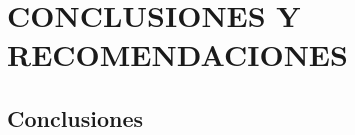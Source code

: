 \documentclass[12pt]{report}
\begin{document}





\pagebreak
\chapter{CONCLUSIONES Y RECOMENDACIONES}


\section{Conclusiones}





\pagebreak
{}
\printbibliography
\thispagestyle{empty}

\end{document}
